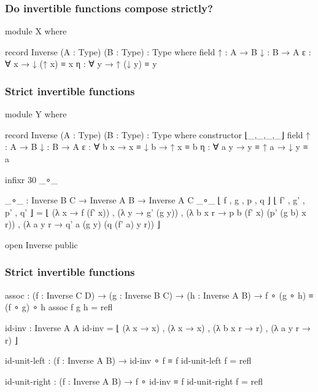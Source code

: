 \documentclass[presentation]{beamer}
\begin{document}
\begin{frame}
  \frametitle{Do invertible functions compose strictly?}
  \begin{code}[hide]
    module X where
  \end{code}
  \begin{code}
      record Inverse (A : Type) (B : Type) : Type where
        field
          ↑ : A → B
          ↓ : B → A
          ε : ∀ x  → ↓ (↑ x) ≡ x
          η : ∀ y  → ↑ (↓ y) ≡ y
  \end{code}
\end{frame}

\begin{frame}
  \frametitle{Strict invertible functions}
  \begin{code}[hide]
    module Y where
  \end{code}
  \begin{code}
      record Inverse (A : Type) (B : Type) : Type where
        constructor ⌊_,_,_,_⌋
        field
          ↑ : A → B
          ↓ : B → A
          ε : ∀ b x  → x ≡ ↓ b  → ↑ x ≡ b
          η : ∀ a y  → y ≡ ↑ a  → ↓ y ≡ a
  \end{code}
  \begin{code}[hide]
      infixr 30 _∘_
  \end{code}
  \begin{code}
      _∘_ : Inverse B C → Inverse A B → Inverse A C
      _∘_ ⌊ f , g , p , q ⌋ ⌊ f' , g' , p' , q' ⌋ =
        ⌊  (λ x → f (f' x)) ,
           (λ y → g' (g y)) ,
           (λ b x r → p b (f' x) (p' (g b) x r)) ,
           (λ a y r → q' a (g y) (q (f' a) y r)) ⌋

  \end{code}
  \begin{code}[hide]
      open Inverse public
  \end{code}
\end{frame}

\begin{frame}
  \frametitle{Strict invertible functions}
  \begin{code}
      assoc :  (f : Inverse C D)
            →  (g : Inverse B C)
            →  (h : Inverse A B)
            →  f ∘ (g ∘ h) ≡ (f ∘ g) ∘ h
      assoc f g h = refl

      id-inv : Inverse A A
      id-inv = ⌊  (λ x → x) , (λ x → x) ,
                  (λ b x r → r) , (λ a y r → r) ⌋

      id-unit-left :  (f : Inverse A B)
                   →  id-inv ∘ f ≡ f
      id-unit-left f = refl

      id-unit-right :  (f : Inverse A B)
                    →  f ∘ id-inv ≡ f
      id-unit-right f = refl
  \end{code}
\end{frame}
\end{document}
